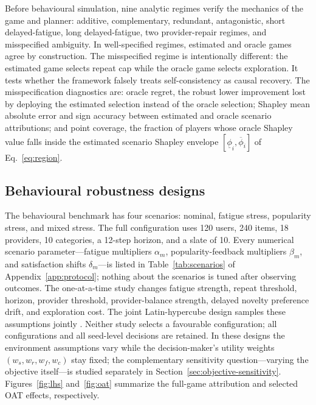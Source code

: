 \documentclass[review]{elsarticle}
\theoremstyle{plain}
\theoremstyle{definition}
\theoremstyle{remark}
\newcommand{\Shap}{\phi}
\begin{document}
Before behavioural simulation, nine analytic regimes verify the mechanics of the game and planner: additive, complementary, redundant, antagonistic, short delayed-fatigue, long delayed-fatigue, two provider-repair regimes, and misspecified ambiguity. In well-specified regimes, estimated and oracle games agree by construction. The misspecified regime is intentionally different: the estimated game selects repeat cap while the oracle game selects exploration. It tests whether the framework falsely treats self-consistency as causal recovery. The misspecification diagnostics are: oracle regret, the robust lower improvement lost by deploying the estimated selection instead of the oracle selection; Shapley mean absolute error and sign accuracy between estimated and oracle scenario attributions; and point coverage, the fraction of players whose oracle Shapley value falls inside the estimated scenario Shapley envelope $[\underline{\Shap}_i,\overline{\Shap}_i]$ of Eq.~\eqref{eq:region}.



\subsection{Behavioural robustness designs}

The behavioural benchmark has four scenarios: nominal, fatigue stress, popularity stress, and mixed stress. The full configuration uses 120 users, 240 items, 18 providers, 10 categories, a 12-step horizon, and a slate of 10. Every numerical scenario parameter---fatigue multipliers $\alpha_m$, popularity-feedback multipliers $\beta_m$, and satisfaction shifts $\delta_m$---is listed in Table~\ref{tab:scenarios} of Appendix~\ref{app:protocol}; nothing about the scenarios is tuned after observing outcomes. The one-at-a-time study changes fatigue strength, repeat threshold, horizon, provider threshold, provider-balance strength, delayed novelty preference drift, and exploration cost. The joint Latin-hypercube design samples these assumptions jointly \cite{mckay1979latin}. Neither study selects a favourable configuration; all configurations and all seed-level decisions are retained. In these designs the environment assumptions vary while the decision-maker's utility weights $(w_s,w_r,w_f,w_c)$ stay fixed; the complementary sensitivity question---varying the objective itself---is studied separately in Section~\ref{sec:objective-sensitivity}. Figures~\ref{fig:lhs} and~\ref{fig:oat} summarize the full-game attribution and selected OAT effects, respectively.
\end{document}
